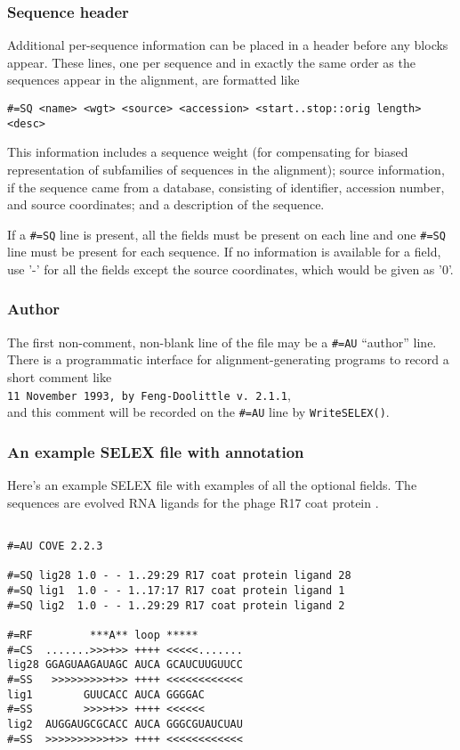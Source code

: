 \subsubsection {Sequence header}

Additional per-sequence information can be placed in a header before
any blocks appear. These lines, one per sequence and in exactly the
same order as the sequences appear in the alignment, are formatted
like 

{\small \begin{verbatim}
#=SQ <name> <wgt> <source> <accession> <start..stop::orig length> <desc>
\end{verbatim}}

This information includes a sequence weight (for compensating for
biased representation of subfamilies of sequences in the alignment);
source information, if the sequence came from a database, consisting
of identifier, accession number, and source coordinates; and a
description of the sequence.

If a \verb+#=SQ+ line is present, all the fields must be present on
each line and one \verb+#=SQ+ line must be present for each sequence.
If no information is available for a field, use '-' for all the fields
except the source coordinates, which would be given as '0'.

\subsubsection {Author}

The first non-comment, non-blank line of the file may be a \verb+#=AU+
``author'' line. There is a programmatic interface for
alignment-generating programs to record a short comment like \\
\verb+11 November 1993, by Feng-Doolittle v. 2.1.1+, \\
and this comment will be
recorded on the \verb+#=AU+ line by \verb+WriteSELEX()+.


\subsubsection{An example SELEX file with annotation}

Here's an example SELEX file with examples of all the optional fields.
The sequences are evolved RNA ligands for the phage R17 coat protein
\cite{Schneider92}.

\begin{verbatim}

#=AU COVE 2.2.3

#=SQ lig28 1.0 - - 1..29:29 R17 coat protein ligand 28
#=SQ lig1  1.0 - - 1..17:17 R17 coat protein ligand 1
#=SQ lig2  1.0 - - 1..29:29 R17 coat protein ligand 2

#=RF         ***A** loop *****
#=CS  .......>>>+>> ++++ <<<<<....... 
lig28 GGAGUAAGAUAGC AUCA GCAUCUUGUUCC
#=SS   >>>>>>>>>+>> ++++ <<<<<<<<<<<<
lig1        GUUCACC AUCA GGGGAC
#=SS        >>>>+>> ++++ <<<<<<
lig2  AUGGAUGCGCACC AUCA GGGCGUAUCUAU
#=SS  >>>>>>>>>>+>> ++++ <<<<<<<<<<<<
\end{verbatim}

